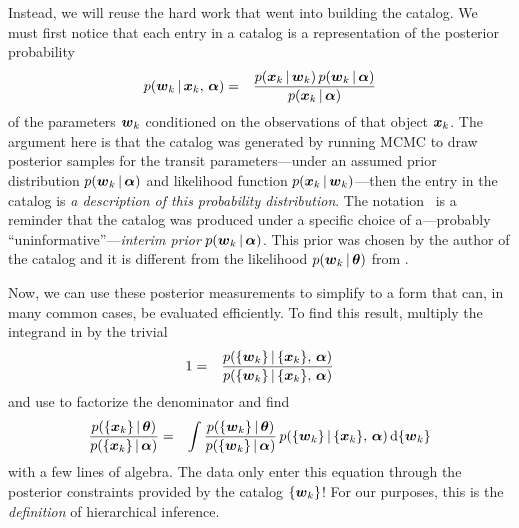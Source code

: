 Instead, we will reuse the hard work that went into building the catalog.
We must first notice that each entry in a catalog is a representation of the
posterior probability
\begin{eqnarray}\eqlabel{crazypost}
p(\entry_k\,|\,\data_k,\,\interim) &=&
\frac{p(\data_k\,|\,\entry_k)\,p(\entry_k\,|\,\interim)}
     {p(\data_k\,|\,\interim)}
\end{eqnarray}
of the parameters ${{\boldsymbol{w}}}_k$ conditioned on the observations of that object
${{\boldsymbol{x}}}_k$.
The argument here is that the catalog was generated by running MCMC to draw
posterior samples for the transit parameters---under an assumed prior
distribution $p({{\boldsymbol{w}}}_k\,|\,{{\boldsymbol{\alpha}}})$ and likelihood function
$p({{\boldsymbol{x}}}_k\,|\,{{\boldsymbol{w}}}_k)$---then the entry in the catalog is \emph{a
description of this probability distribution}.
The notation \interim\ is a reminder that the catalog was produced under a
specific choice of a---probably ``uninformative''---\emph{interim prior}
$p({{\boldsymbol{w}}}_k\,|\,{{\boldsymbol{\alpha}}})$.
This prior was chosen by the author of the catalog and it is different from
the likelihood $p({{\boldsymbol{w}}}_k\,|\,{{\boldsymbol{{\theta}}}})$ from .

Now, we can use these posterior measurements to simplify  to a
form that can, in many common cases, be evaluated efficiently.
To find this result, multiply the integrand in  by the trivial
\begin{eqnarray}
1 &=&
\frac{p(\{{{\boldsymbol{w}}}_k\}\,|\,\{{{\boldsymbol{x}}}_k\},\,{{\boldsymbol{\alpha}}})}
     {p(\{{{\boldsymbol{w}}}_k\}\,|\,\{{{\boldsymbol{x}}}_k\},\,{{\boldsymbol{\alpha}}})}
\end{eqnarray}
and use  to factorize the denominator and find
\begin{eqnarray}\eqlabel{simplemarglike}
\frac{p(\{\data_k\}\,|\,\ratepars)}{p(\{\data_k\}\,|\,\interim)} &=&
    \int
    \frac{p(\{\entry_k\}\,|\,\ratepars)}{p(\{\entry_k\}\,|\,\interim)}\,
    p(\{\entry_k\}\,|\,\{\data_k\},\,\interim)
    \dd\{\entry_k\}
\end{eqnarray}
with a few lines of algebra.
The data only enter this equation through the posterior constraints provided
by the catalog $\{{{\boldsymbol{w}}}_k\}$!
For our purposes, this is the \emph{definition} of hierarchical inference.

